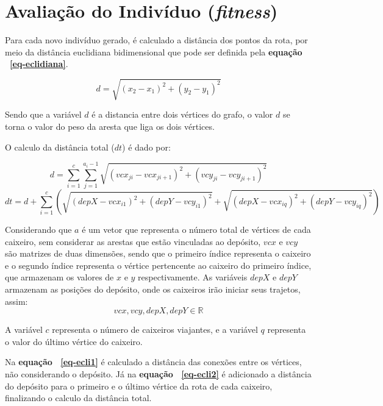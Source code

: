 \documentclass[12pt,openright,a4paper,oneside]{tcc}
\begin{document}
	   	
	   	\section{Avaliação do Indivíduo (\textit{fitness})}

		Para cada novo indivíduo gerado, é calculado a distância dos pontos da rota, por meio da distância euclidiana bidimensional que pode ser definida pela \textbf{equação ~\ref{eq-eclidiana}}.

		\begin{equation}
			d = \sqrt{(x_2-x_1)^2 + (y_2-y_1)^2}
			\label{eq-eclidiana}
		\end{equation}

		Sendo que a variável $d$ é a distancia entre dois vértices do grafo, o valor $d$ se torna o valor do peso da aresta que liga os dois vértices.

		O calculo da distância total ($dt$) é dado por:

		\begin{equation}
			d = \sum_{i=1}^{c} \sum_{j=1}^{a_i-1} \sqrt{(vcx_{ji}-vcx_{ji+1})^2 + (vcy_{ji}-vcy_{ji+1})^2}
			\label{eq-ecli1}
		\end{equation}
		\begin{equation}
			dt = d + \sum_{i=1}^{c} (\sqrt{(depX-vcx_{i1})^2 + (depY-vcy_{i1})^2} + \sqrt{(depX-vcx_{iq})^2 + (depY-vcy_{iq})^2})
			\label{eq-ecli2}
		\end{equation}

		Considerando que $a$ é um vetor que representa o número total de vértices de cada caixeiro, sem considerar as  arestas que estão vinculadas ao depósito, $vcx$ e $vcy$ são matrizes de duas dimensões, sendo que o primeiro índice representa o caixeiro e o segundo índice representa o vértice pertencente ao caixeiro do primeiro índice, que armazenam os valores de $x$ e $y$ respectivamente. As variáveis $depX$ e $depY$ armazenam as posições do depósito, onde os caixeiros irão iniciar seus trajetos, assim:
		\begin{equation}
			vcx, vcy, depX, depY \in \mathbb{R}   
			\label{eq-ecli4}
		\end{equation}

		A variável $c$ representa o número de caixeiros viajantes, e a variável $q$ representa o valor do último vértice do caixeiro.

		Na \textbf{equação ~\ref{eq-ecli1}} é calculado a distância das conexões entre os vértices, não considerando o depósito. Já na \textbf{equação ~\ref{eq-ecli2}} é adicionado a distância do depósito para o primeiro e o último vértice da rota de cada caixeiro, finalizando o calculo da distância total.
\end{document}
